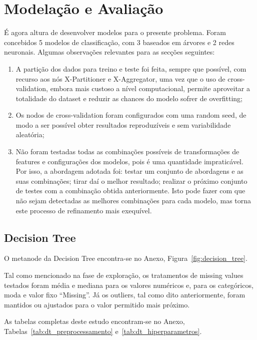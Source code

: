 \documentclass[11pt,a4paper]{article}
\newcommand{\code}[1]{{\ttfamily\hyphenchar\font=45\relax #1}}
\begin{document}
\section{Modelação e Avaliação}

É agora altura de desenvolver modelos para o presente problema. Foram concebidos 5 modelos de classificação, com 3 baseados em árvores e 2 redes neuronais. Algumas observações relevantes para as secções seguintes:

\begin{enumerate}
    \item A partição dos dados para treino e teste foi feita, sempre que possível, com recurso aos nós \code{X-Partitioner} e \code{X-Aggregator}, uma vez que o uso de cross-validation, embora mais custoso a nível computacional, permite aproveitar a totalidade do dataset e reduzir as chances do modelo sofrer de overfitting;
    \item Os nodos de cross-validation foram configurados com uma random seed, de modo a ser possível obter resultados reproduzíveis e sem variabilidade aleatória;
    \item Não foram testadas todas as combinações possíveis de transformações de features e configurações dos modelos, pois é uma quantidade impraticável. Por isso, a abordagem adotada foi: testar um conjunto de abordagens e as suas combinações; tirar daí o melhor resultado; realizar o próximo conjunto de testes com a combinação obtida anteriormente. Isto pode fazer com que não sejam detectadas as melhores combinações para cada modelo, mas torna este processo de refinamento mais exequível.
\end{enumerate}

\subsection{Decision Tree}

O metanode da Decision Tree encontra-se no Anexo, Figura~\ref{fig:decision_tree}.

Tal como mencionado na fase de exploração, os tratamentos de missing values testados foram média e mediana para os valores numéricos e, para os categóricos, moda e valor fixo ``Missing''. Já os outliers, tal como dito anteriormente, foram mantidos ou ajustados para o valor permitido mais próximo.

As tabelas completas deste estudo encontram-se no Anexo, Tabelas~\ref{tab:dt_preprocessamento} e~\ref{tab:dt_hiperparametros}.
\end{document}

